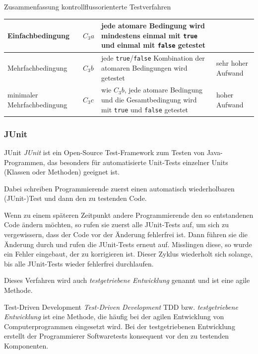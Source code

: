 \begin{bonus}{Zusammenfassung kontrollflussorienterte Testverfahren}
\begin{tabularx}{\textwidth}{|p{4.1cm}|l|X|X|}
        Einfachbedingung                      & $C_3a$           & jede atomare Bedingung wird mindestens einmal mit \texttt{true} und einmal mit \texttt{false} getestet        &                                                       \\
        \hline
        Mehrfachbedingung                     & $C_3b$           & jede \texttt{true}/\texttt{false} Kombination der atomaren Bedingungen wird getestet                          & sehr hoher Aufwand                                    \\
        \hline
        minimaler Mehrfachbedingung           & $C_3c$           & wie $C_3b$, jede atomare Bedingung und die Gesamtbedingung wird mit \texttt{true} und \texttt{false} getestet & hoher Aufwand                                         \\
        \hline
    \end{tabularx}
\end{bonus}

\subsubsection{JUnit}

\begin{bonus}{JUnit}
    \emph{JUnit} ist ein Open-Source Test-Framework zum Testen von Java-Programmen, das besonders für automatisierte Unit-Tests einzelner Units (Klassen oder Methoden) geeignet ist.

    Dabei schreiben Programmierende zuerst einen automatisch wiederholbaren (JUnit-)Test und dann den zu testenden Code.

    Wenn zu einem späteren Zeitpunkt andere Programmierende den so entstandenen Code ändern möchten, so rufen sie zuerst alle JUnit-Tests auf, um sich zu vergewissern, dass der Code vor der Änderung fehlerfrei ist.
    Dann führen sie die Änderung durch und rufen die JUnit-Tests erneut auf.
    Misslingen diese, so wurde ein Fehler eingebaut, der zu korrigieren ist.
    Dieser Zyklus wiederholt sich solange, bis alle JUnit-Tests wieder fehlerfrei durchlaufen.

    Dieses Verfahren wird auch \emph{testgetriebene Entwicklung} genannt und ist eine agile Methode.
\end{bonus}

\begin{bonus}{Test-Driven Development}
    \emph{Test-Driven Development} TDD bzw. \emph{testgetriebene Entwicklung} ist eine Methode, die häufig bei der agilen Entwicklung von Computerprogrammen eingesetzt wird.
    Bei der testgetriebenen Entwicklung erstellt der Programmierer Softwaretests konsequent vor den zu testenden Komponenten.
\end{bonus}


